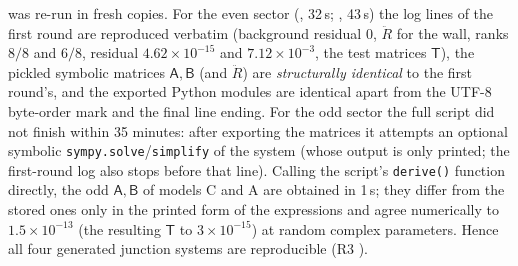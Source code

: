  was re-run in fresh copies. For the even sector (, 32\,s;
, 43\,s) the log lines of the first round are reproduced verbatim (background residual 0, $\ddot R$ for the
wall, ranks $8/8$ and $6/8$, residual $4.62\times10^{-15}$ and $7.12\times10^{-3}$, the test matrices $\mathsf T$), the
pickled symbolic matrices $\mathsf A,\mathsf B$ (and $\ddot R$) are \emph{structurally identical} to the first round's,
and the exported Python modules are identical apart from the UTF-8 byte-order mark and the final line ending. For the
odd sector the full script did not finish within 35 minutes: after exporting the matrices it attempts an optional
symbolic \texttt{sympy.solve}/\texttt{simplify} of the system (whose output is only printed; the first-round log also
stops before that line). Calling the script's \texttt{derive()} function directly, the odd $\mathsf A,\mathsf B$ of models C
and A are obtained in 1\,s; they differ from the stored ones only in the printed form of the expressions and agree
numerically to $1.5\times10^{-13}$ (the resulting $\mathsf T$ to $3\times10^{-15}$) at random complex parameters. Hence
all four generated junction systems are reproducible (R3 \OK).
